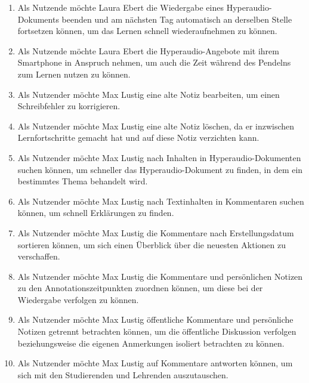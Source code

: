 \begin{enumerate}[label=US-\arabic*:,ref=US-\arabic*]
\item \label{US-Fortsetzen} Als Nutzende möchte Laura Ebert die Wiedergabe eines Hyperaudio-Dokuments beenden und am nächsten Tag automatisch an derselben Stelle fortsetzen können, um das Lernen schnell wiederaufnehmen zu können.

\item \label{US-Mobil} Als Nutzende möchte Laura Ebert die Hyperaudio-Angebote mit ihrem Smartphone in Anspruch nehmen, um auch die Zeit während des Pendelns zum Lernen nutzen zu können.

\item \label{US-Notiz-Bearbeiten} Als Nutzender möchte Max Lustig eine alte Notiz bearbeiten, um einen Schreibfehler zu korrigieren.

\item \label{US-Notiz-Loeschen} Als Nutzender möchte Max Lustig eine alte Notiz löschen, da er inzwischen Lernfortschritte gemacht hat und auf diese Notiz verzichten kann.

\item \label{US-Galerie} Als Nutzender möchte Max Lustig nach Inhalten in Hyperaudio-Dokumenten suchen können, um schneller das Hyperaudio-Dokument zu finden, in dem ein bestimmtes Thema behandelt wird.

\item \label{US-Suche} Als Nutzender möchte Max Lustig nach Textinhalten in Kommentaren suchen können, um schnell Erklärungen zu finden.

\item \label{US-Sortierung-Erstellungsdatum} Als Nutzender möchte Max Lustig die Kommentare nach Erstellungsdatum sortieren können, um sich einen Überblick über die neuesten Aktionen zu verschaffen.

\item \label{US-Sortierung-Zeitpunkt} Als Nutzender möchte Max Lustig die Kommentare und persönlichen Notizen zu den Annotationszeitpunkten zuordnen können, um diese bei der Wiedergabe verfolgen zu können.

\item \label{US-Filter} Als Nutzender möchte Max Lustig öffentliche Kommentare und persönliche Notizen getrennt betrachten können, um die öffentliche Diskussion verfolgen beziehungsweise die eigenen Anmerkungen isoliert betrachten zu können.

\item \label{US-Antwort-S} Als Nutzender möchte Max Lustig auf Kommentare antworten können, um sich mit den Studierenden und Lehrenden auszutauschen.


\end{enumerate}
